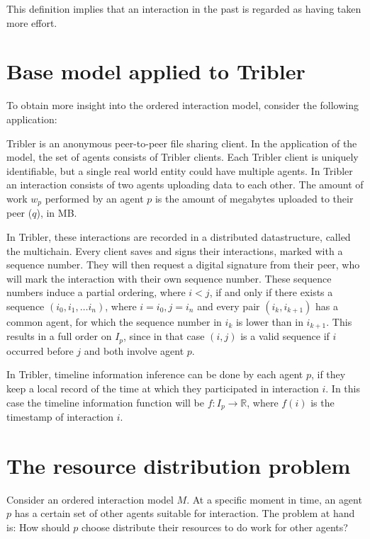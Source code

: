 \documentclass[a4paper,11pt]{book}
\newcommand{\bb}{\mathbb}
\theoremstyle{definition}
\begin{document}
This definition implies that an interaction in the past is regarded as having taken more effort.



\section{Base model applied to Tribler}

To obtain more insight into the ordered interaction model, consider the following application:

Tribler is an anonymous peer-to-peer file sharing client. In the application of the model,
the set of agents consists of Tribler clients. Each Tribler client is uniquely identifiable,
but a single real world entity could have multiple agents. In Tribler an interaction
consists of two agents uploading data to each other. The amount of work $w_p$ performed
by an agent $p$ is the amount of megabytes uploaded to their peer ($q$), in MB.

In Tribler, these interactions are recorded in a distributed datastructure, called the multichain.
Every client saves and signs their interactions, marked with a sequence number. They will then request
a digital signature from their peer, who will mark the interaction with their own sequence number.
These sequence numbers induce a partial ordering, where $i < j$, if and only if there exists
a sequence $(i_0, i_1, \ldots i_n)$, where $i=i_0, j=i_n$ and every pair $(i_k, i_{k+1})$ has
a common agent, for which the sequence number in $i_k$ is lower than in $i_{k+1}$.
This results in a full order on $I_p$, since in that case $(i, j)$ is a valid sequence if
$i$ occurred before $j$ and both involve agent $p$.

In Tribler, timeline information inference can be done by each agent $p$, if they
keep a local record of the time at which they participated in interaction $i$. In this
case the timeline information function will be $f : I_p \to \bb{R}$, where $f(i)$ is
the timestamp of interaction $i$.



\section{The resource distribution problem}

Consider an ordered interaction model $M$. At a specific moment in time, an agent
$p$ has a certain set of other agents suitable for interaction. The problem
at hand is: How should $p$ choose distribute their resources to do work for other agents?
\end{document}
